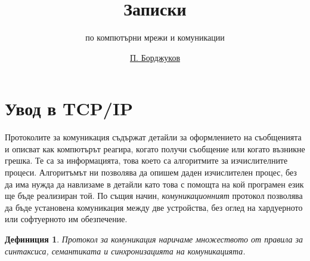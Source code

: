 \documentclass{scrartcl}
\newtheorem{definition}{Дефиниция}
\begin{document}
\title{Записки}
\subtitle{по компютърни мрежи и комуникации}
\author{\href{mailto:bordjukov@gmail.com}{П. Борджуков}}
\date{}

\maketitle

\section{Увод в TCP/IP}

Протоколите за комуникация съдържат детайли за оформлението на съобщенията и
описват как компютърът реагира, когато получи съобщение или когато възникне
грешка. Те са за информацията, това което са алгоритмите за изчислителните
процеси. Алгоритъмът ни позволява да опишем даден изчислителен процес, без да
има нужда да навлизаме в детайли като това с помощта на кой програмен език ще
бъде реализиран той. По същия начин, \emph{комуникационният} протокол позволява
да бъде установена комуникация между две устройства, без оглед на хардуерното
или софтуерното им обезпечение.

\begin{definition}
  Протокол за комуникация наричаме множеството от правила за синтаксиса,
  семантиката и синхронизацията на комуникацията.
\end{definition}
\end{document}
